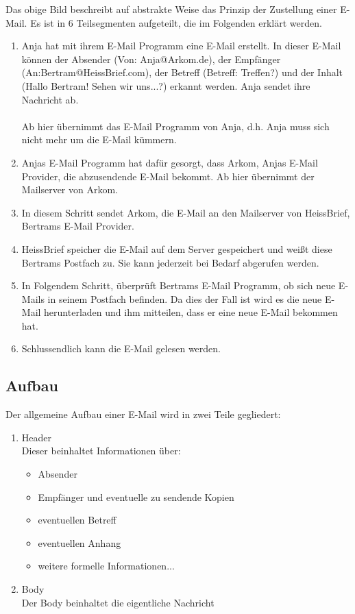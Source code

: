 \documentclass[12pt,a4paper]{report}
\begin{document}
\begin{onehalfspace}
Das obige Bild beschreibt auf abstrakte Weise das Prinzip der Zustellung einer E-Mail. Es ist in 6 Teilsegmenten aufgeteilt, die im Folgenden erklärt werden.

\begin{enumerate}
\item Anja hat mit ihrem E-Mail Programm eine E-Mail erstellt. In dieser E-Mail können der Absender (Von: Anja@Arkom.de), der Empfänger (An:Bertram@HeissBrief.com), der Betreff (Betreff: Treffen?) und der Inhalt (Hallo Bertram! Sehen wir uns...?) erkannt werden. Anja sendet ihre Nachricht ab.\\\\
Ab hier übernimmt das E-Mail Programm von Anja, d.h. Anja muss sich nicht mehr um die E-Mail kümmern.
\item Anjas E-Mail Programm hat dafür gesorgt, dass Arkom,  Anjas E-Mail Provider, die abzusendende E-Mail bekommt. Ab hier übernimmt der Mailserver von Arkom.
\item In diesem Schritt sendet Arkom, die E-Mail an den Mailserver von HeissBrief, Bertrams E-Mail Provider.
\item HeissBrief speicher die E-Mail auf dem Server gespeichert und weißt diese Bertrams Postfach zu. Sie kann jederzeit bei Bedarf abgerufen werden.
\item In Folgendem Schritt, überprüft Bertrams E-Mail Programm, ob sich neue E-Mails in seinem Postfach befinden. Da dies der Fall ist wird es die neue E-Mail herunterladen und ihm mitteilen, dass er eine neue E-Mail bekommen hat.
\item Schlussendlich kann die E-Mail gelesen werden.
\end{enumerate} 

\subsection{Aufbau}
Der allgemeine Aufbau einer E-Mail wird in zwei Teile gegliedert:
\begin{enumerate}
\item Header\\
Dieser beinhaltet Informationen über:
\begin{itemize}
\item Absender
\item Empfänger und eventuelle zu sendende Kopien
\item eventuellen Betreff
\item eventuellen Anhang
\item weitere formelle Informationen...
\end{itemize}
\item Body\\
Der Body beinhaltet die eigentliche Nachricht
\end{enumerate} 

\end{onehalfspace}
\end{document}
